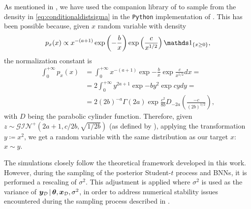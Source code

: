 As mentioned in , we have used the companion library of \citet{ding2022} to sample from the density in \cref{eq:conditionaldistsigma} in the \texttt{Python} implementation of . This has been possible because, given $x$ random variable with density
\begin{equation*}
	p_{x}(x) \propto x^{-(a + 1)} \exp{-\frac{b}{x}} \exp{\frac{c}{x^{1/2}}} \indic{\{x \geq 0\}},
\end{equation*}
the normalization constant is
\begin{align*}
	\int_{0}^{+\infty} p_{x}(x) &= \int_{0}^{+\infty} x^{-(a + 1)} \exp{-\frac{b}{x}} \exp{\frac{c}{x^{1/2}}} dx = \\
	& = 2 \int_{0}^{+\infty} y^{2a + 1} \exp{-b y^2} \exp{cy} dy = \\
	&= 2 (2b)^{-a} \Gamma(2a) \exp{\frac{c^2}{8b}} D_{-2a}\left(\frac{-c}{(2b)^{1/2}}\right),
\end{align*}
with $D$ being the parabolic cylinder function. Therefore, given $z \sim \mathcal{GIN}^+(2a + 1, c/2b, \sqrt{1/2b})$ (as defined by \citet[Appendix D]{ding2022}), applying the transformation $y \coloneqq x^2$, we get a random variable with the same distribution as our target $x$: $x \sim y$.  

\begin{remark}
	The simulations closely follow the theoretical framework developed in this work. 
	However, during the sampling of the posterior Student-$t$ process and BNNs, it is performed a rescaling of $\sigma^2$. This adjustment is applied where $\sigma^2$ is used as the variance of $\bm{y}_{\mathcal{D}} \, | \, \bm{\theta}, \bm{x}_{\mathcal{D}}, \sigma^2$, in order to address numerical stability issues encountered during the sampling process described in .
\end{remark}